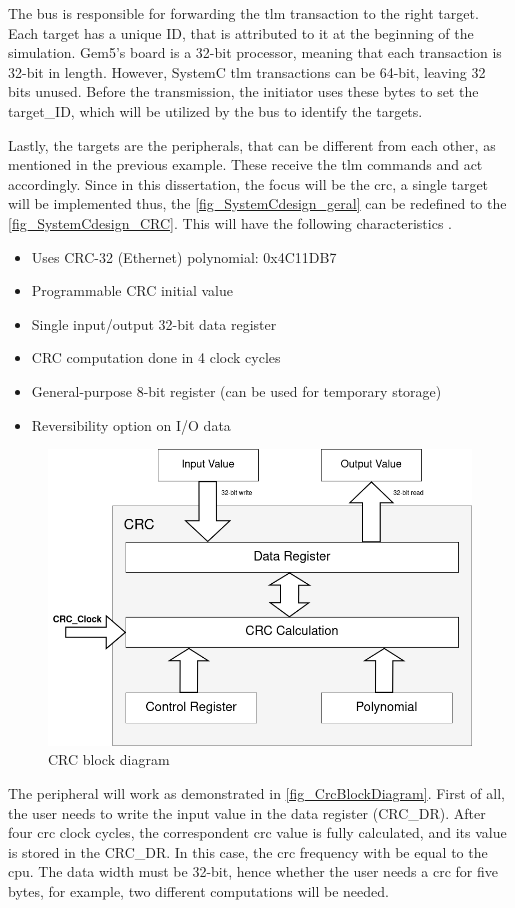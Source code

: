 The bus is responsible for forwarding the \gls{tlm} transaction to the right target. Each target has a unique ID, that is attributed to it 
at the beginning of the simulation. Gem5's board is a 32-bit processor, meaning that each transaction is 32-bit in length. However, SystemC 
\gls{tlm} transactions can be 64-bit, leaving 32 bits unused. Before the transmission, the initiator uses these bytes to set the 
target\_ID, which will be utilized by the bus to identify the targets.

Lastly, the targets are the peripherals, that can be different from each other, as mentioned in the previous example. These receive the 
\gls{tlm} commands and act accordingly. Since in this dissertation, the focus will be the \gls{crc}, a single target will be implemented
thus, the \autoref{fig_SystemCdesign_geral} can be redefined to the \autoref{fig_SystemCdesign_CRC}. This will have the following
characteristics \cite{referenceManualRM0385}. 

\begin{itemize}
	\item Uses CRC-32 (Ethernet) polynomial: 0x4C11DB7
	\item Programmable CRC initial value
	\item Single input/output 32-bit data register
	\item CRC computation done in 4 clock cycles 
	\item General-purpose 8-bit register (can be used for temporary storage)
	\item Reversibility option on I/O data
\end{itemize}

\begin{figure}[]
	\centering
 	\includegraphics[width=0.6\linewidth]{Images/CrcBlockDiagram.png}
 	\caption{CRC block diagram}
	 \label{fig_CrcBlockDiagram}
\end{figure}

The peripheral will work as demonstrated in \autoref{fig_CrcBlockDiagram}. First of all, the user needs to write the input value 
in the data register (CRC\_DR). After four \gls{crc} clock cycles, the correspondent \gls{crc} value is fully calculated, and its
value is stored in the CRC\_DR. In this case, the \gls{crc} frequency with be equal to the \gls{cpu}. The data width must be 32-bit, 
hence whether the user needs a \gls{crc} for five bytes, for example, two different computations will be needed. 

